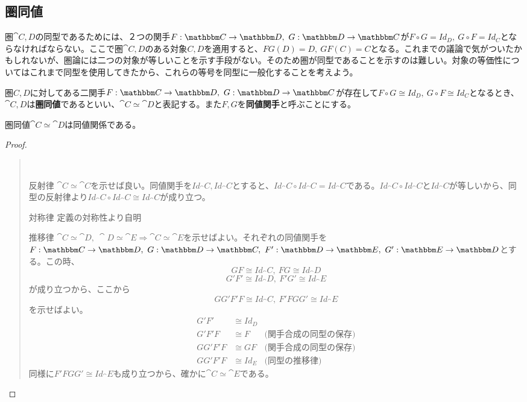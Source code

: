 \subsection{圏同値}
  圏$\cat{C,D}$の同型であるためには、２つの関手$\functor{F}{C}{D},\ \functor{G}{D}{C}$が$F\circ G=Id_D,\ G\circ F=Id_C$とならなければならない。ここで圏$\cat{C,D}$のある対象$C,D$を適用すると、$FG(D)=D,\ GF(C)=C$となる。これまでの議論で気がついたかもしれないが、圏論には二つの対象が等しいことを示す手段がない。そのため圏が同型であることを示すのは難しい。対象の等価性についてはこれまで同型を使用してきたから、これらの等号を同型に一般化することを考えよう。\\
  \begin{define}
    圏$C,D$に対してある二関手$\functor{F}{C}{D},\ \functor{G}{D}{C}$が存在して$F\circ G\cong Id_D,\ G\circ F\cong Id_C$となるとき、$\cat{C,D}$は\textbf{圏同値}であるといい、$\cat{C}\simeq \cat{D}$と表記する。また$F,G$を\textbf{同値関手}と呼ぶことにする。
  \end{define}
  \begin{prop}[圏同値の同値性]
    圏同値$\cat{C}\simeq \cat{D}$は同値関係である。
  \end{prop}
  \begin{proof}
    \begin{quote}~\\
			\begin{mydescription}
				\item[反射律] $\cat{C}\simeq \cat{C}$を示せば良い。同値関手を$Id_\cat{C},Id_\cat{C}$とすると、$Id_\cat{C}\circ Id_\cat{C}=Id_\cat{C}$である。$Id_\cat{C}\circ Id_\cat{C}$と$Id_\cat{C}$が等しいから、同型の反射律より$Id_\cat{C}\circ Id_\cat{C}\cong Id_\cat{C}$が成り立つ。
				\item[対称律]定義の対称性より自明
				\item[推移律]$\cat{C}\simeq \cat{D},\ \cat{D}\simeq\cat{E}\Longrightarrow \cat{C}\simeq\cat{E}$を示せばよい。それぞれの同値関手を$\functor{F}{C}{D},\ \functor{G}{D}{C},\ \functor{F'}{D}{E},\ \functor{G'}{E}{D}$とする。この時、
				\[GF\cong Id_\cat{C},\ FG\cong Id_\cat{D}\]
        \[G'F'\cong Id_\cat{D},\ F'G'\cong Id_\cat{E}\]が成り立つから、ここから\[GG'F'F\cong Id_\cat{C},\ F'FGG'\cong Id_\cat{E}\]を示せばよい。\\
        \begin{align*}
          G'F'&\cong Id_D\\
          G'F'F&\cong F&\text{(関手合成の同型の保存)}\\
          GG'F'F&\cong GF&\text{(関手合成の同型の保存)}\\
          GG'F'F&\cong Id_E&\text{(同型の推移律)}
        \end{align*}
        同様に$F'FGG'\cong Id_\cat{E}$も成り立つから、確かに$\cat{C}\simeq\cat{E}$である。
      \end{mydescription}
    \end{quote}
  \end{proof}
